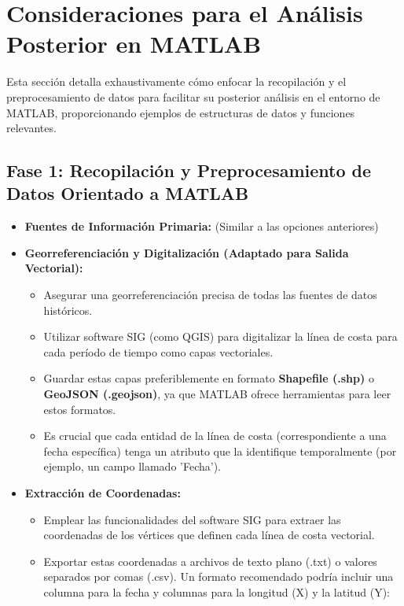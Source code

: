 \documentclass{article}
\begin{document}
\section*{Consideraciones para el Análisis Posterior en MATLAB}

Esta sección detalla exhaustivamente cómo enfocar la recopilación y el preprocesamiento de datos para facilitar su posterior análisis en el entorno de MATLAB, proporcionando ejemplos de estructuras de datos y funciones relevantes.

\subsection*{Fase 1: Recopilación y Preprocesamiento de Datos Orientado a MATLAB}

\begin{itemize}
    \item \textbf{Fuentes de Información Primaria:} (Similar a las opciones anteriores)
    \item \textbf{Georreferenciación y Digitalización (Adaptado para Salida Vectorial):}
    \begin{itemize}
        \item Asegurar una georreferenciación precisa de todas las fuentes de datos históricos.
        \item Utilizar software SIG (como QGIS) para digitalizar la línea de costa para cada período de tiempo como capas vectoriales.
        \item Guardar estas capas preferiblemente en formato \textbf{Shapefile (.shp)} o \textbf{GeoJSON (.geojson)}, ya que MATLAB ofrece herramientas para leer estos formatos.
        \item Es crucial que cada entidad de la línea de costa (correspondiente a una fecha específica) tenga un atributo que la identifique temporalmente (por ejemplo, un campo llamado 'Fecha').
    \end{itemize}
    \item \textbf{Extracción de Coordenadas:}
    \begin{itemize}
        \item Emplear las funcionalidades del software SIG para extraer las coordenadas de los vértices que definen cada línea de costa vectorial.
        \item Exportar estas coordenadas a archivos de texto plano (.txt) o valores separados por comas (.csv). Un formato recomendado podría incluir una columna para la fecha y columnas para la longitud (X) y la latitud (Y):

\end{itemize}
\end{itemize}
\end{document}
